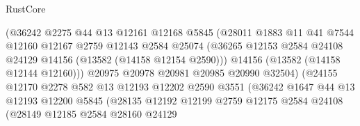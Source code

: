 \begin{lexlean}{RustCore}
\begin{coremodule}
                                (@36242
                                  @2275
                                  @44
                                  @13
                                  @12161
                                  @12168
                                  @5845
                                  (@28011
                                    @1883
                                    @11
                                    @41
                                    @7544
                                    @12160
                                    @12167
                                    @2759
                                    @12143
                                    @2584
                                    @25074
                                    (@36265
                                      @12153
                                      @2584
                                      @24108
                                      @24129
                                      @14156
                                      (@13582 (@14158 @12154 @2590)))
                                    @14156
                                    (@13582 (@14158 @12144 @12160)))
                                  @20975
                                  @20978
                                  @20981
                                  @20985
                                  @20990
                                  @32504)
                                (@24155
                                  @12170
                                  @2278
                                  @582
                                  @13
                                  @12193
                                  @12202
                                  @2590
                                  @3551
                                  (@36242
                                    @1647
                                    @44
                                    @13
                                    @12193
                                    @12200
                                    @5845
                                    (@28135
                                      @12192
                                      @12199
                                      @2759
                                      @12175
                                      @2584
                                      @24108
                                      (@28149
                                        @12185
                                        @2584
                                        @28160
                                        @24129

\end{coremodule}
\end{lexlean}
